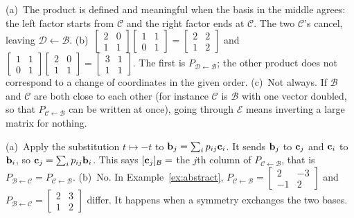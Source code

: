 \documentclass[11pt]{article}
\begin{document}
\begin{description}[leftmargin=0pt,itemsep=5pt]
  \item[Pause and think \ref{think:order}.] (a)~The product is defined and meaningful when the basis in the middle agrees: the left factor starts from $\mathcal{C}$ and the right factor ends at $\mathcal{C}$. The two $\mathcal{C}$'s cancel, leaving $\mathcal{D}\leftarrow\mathcal{B}$. (b)~$\begin{bmatrix}2&0\\1&1\end{bmatrix}\begin{bmatrix}1&1\\0&1\end{bmatrix}=\begin{bmatrix}2&2\\1&2\end{bmatrix}$ and $\begin{bmatrix}1&1\\0&1\end{bmatrix}\begin{bmatrix}2&0\\1&1\end{bmatrix}=\begin{bmatrix}3&1\\1&1\end{bmatrix}$. The first is $P_{\mathcal{D}\leftarrow\mathcal{B}}$; the other product does not correspond to a change of coordinates in the given order. (c)~Not always. If $\mathcal{B}$ and $\mathcal{C}$ are both close to each other (for instance $\mathcal{C}$ is $\mathcal{B}$ with one vector doubled, so that $P_{\mathcal{C}\leftarrow\mathcal{B}}$ can be written at once), going through $\mathcal{E}$ means inverting a large matrix for nothing.
  \item[Pause and think \ref{think:selfinv}.] (a)~Apply the substitution $t\mapsto-t$ to $\mathbf{b}_j=\sum_ip_{ij}\mathbf{c}_i$. It sends $\mathbf{b}_j$ to $\mathbf{c}_j$ and $\mathbf{c}_i$ to $\mathbf{b}_i$, so $\mathbf{c}_j=\sum_ip_{ij}\mathbf{b}_i$. This says $[\mathbf{c}_j]_{\mathcal{B}}=$ the $j$th column of $P_{\mathcal{C}\leftarrow\mathcal{B}}$, that is $P_{\mathcal{B}\leftarrow\mathcal{C}}=P_{\mathcal{C}\leftarrow\mathcal{B}}$. (b)~No. In Example~\ref{ex:abstract}, $P_{\mathcal{C}\leftarrow\mathcal{B}}=\begin{bmatrix}2&-3\\-1&2\end{bmatrix}$ and $P_{\mathcal{B}\leftarrow\mathcal{C}}=\begin{bmatrix}2&3\\1&2\end{bmatrix}$ differ. It happens when a symmetry exchanges the two bases.

\end{description}
\end{document}
